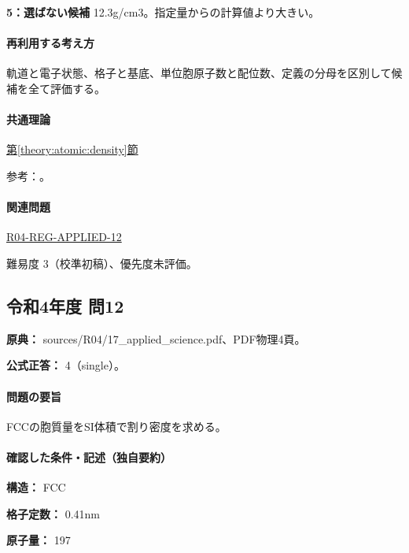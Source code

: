 \noindent\textbf{5：選ばない候補} 12.3g/cm3。指定量からの計算値より大きい。\par

\paragraph{再利用する考え方} 軌道と電子状態、格子と基底、単位胞原子数と配位数、定義の分母を区別して候補を全て評価する。

\paragraph{共通理論} \hyperref[theory:atomic:density]{第\ref*{theory:atomic:density}節}

\par 参考：\cite{openstax_crystals}。

\paragraph{関連問題} \hyperref[q:r04-reg-applied-12]{R04-REG-APPLIED-12}

\par 難易度 3（校準初稿）、優先度未評価。

\subsection{令和4年度 問12}
\label{q:r04-reg-applied-12}

\noindent\textbf{原典：} sources/R04/17\_applied\_science.pdf、PDF物理4頁。

\textbf{公式正答：} 4（single）。

\paragraph{問題の要旨} FCCの胞質量をSI体積で割り密度を求める。

\paragraph{確認した条件・記述（独自要約）}\mbox{}\par

\noindent\textbf{構造：} FCC\par

\noindent\textbf{格子定数：} 0.41nm\par

\noindent\textbf{原子量：} 197\par

